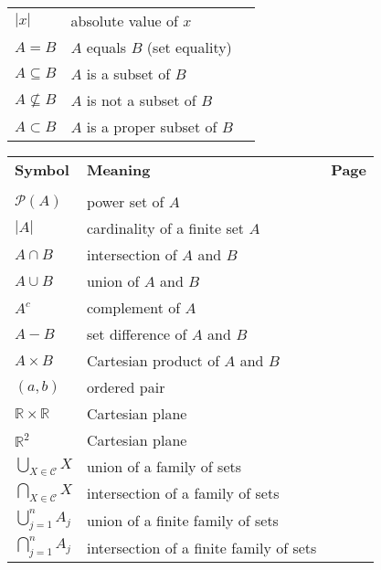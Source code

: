 \begin{tabular}{p{1in} p{2.5in} l}
$\left| x \right|$  & absolute value of $x$  & \pageref{sym:absvalue} \\
$A = B$            &  $A$ equals $B$ (set equality)  &  \pageref{sym:setequal2} \\
$A \subseteq B$    &  $A$ is a subset of $B$         &  \pageref{sym:subset2}  \\
$A \not \subseteq B$ & $A$ is not a subset of $B$    &  \pageref{sym:notsubset2} \\
$A \subset B$      &  $A$ is a proper subset of $B$  &  \pageref{sym:propersub} \\
\end{tabular}

\begin{tabular}{p{1in} p{2.5in} l}
\textbf{Symbol}              &  \textbf{Meaning}  &  \textbf{Page} \\
        &           &       \\ 
$\mathcal{P}( A )$  &  power set of $A$   &  \pageref{sym:powerset} \\
$\left| A \right|$ &  cardinality of a finite set $A$ & \pageref{sym:finitecard} \\
$A \cap B$         &  intersection of $A$ and $B$    &  \pageref{sym:intersect}  \\
$A \cup B$         &  union of $A$ and $B$           &  \pageref{sym:union}  \\
$A^c$              &  complement of $A$              &  \pageref{sym:complement}  \\
$A - B$            &  set difference of $A$ and $B$  &  \pageref{sym:setdiff}  \\
$A \times B$       &  Cartesian product of $A$ and $B$ & \pageref{sym:cartprod}  \\
$( {a,b} )$ &  ordered pair               &  \pageref{sym:orderedpair}  \\
$\mathbb{R} \times \mathbb{R}$ &  Cartesian plane    & \pageref{sym:cartplane}  \\
$\mathbb{R}^2$ &  Cartesian plane    & \pageref{sym:cartplane}  \\
$\bigcup\limits_{X \in \mathscr{C}}^{}X$ & union of a family of sets  &  \pageref{sym:bigcup} \\
$\bigcap\limits_{X \in \mathscr{C}}^{}X$ & intersection of a family of sets  &  \pageref{sym:bigcap} \\
$\bigcup\limits_{j=1}^{n}A_j$ & union of a finite family of sets & \pageref{sym:unionfiniteindex} \\
$\bigcap\limits_{j=1}^{n}A_j$ & intersection of a finite family of sets & \pageref{sym:interfiniteindex} \\

\end{tabular}
